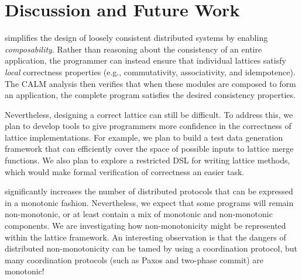 \section{Discussion and Future Work}
\label{sec:discussion}

\lang simplifies the design of loosely consistent distributed systems by
enabling \emph{composability}. Rather than reasoning about the consistency of an
entire application, the programmer can instead ensure that individual lattices
satisfy \emph{local} correctness properties (e.g., commutativity, associativity,
and idempotence). The CALM analysis then verifies that when these modules are
composed to form an application, the complete program satisfies the desired
consistency properties.

Nevertheless, designing a correct lattice can still be difficult. To address
this, we plan to develop tools to give programmers more confidence in the
correctness of lattice implementations. For example, we plan to build a test
data generation framework that can efficiently cover the space of possible
inputs to lattice merge functions. We also plan to explore a restricted DSL for
writing lattice methods, which would make formal verification of correctness an
easier task.

\lang significantly increases the number of distributed protocols that can be
expressed in a monotonic fashion. Nevertheless, we expect that some programs
will remain non-monotonic, or at least contain a mix of monotonic and
non-monotonic components. We are investigating how non-monotonicity might be
represented within the lattice framework. An interesting observation is that the
dangers of distributed non-monotonicity can be tamed by using a coordination
protocol, but many coordination protocols (such as Paxos and two-phase commit)
are monotonic!


